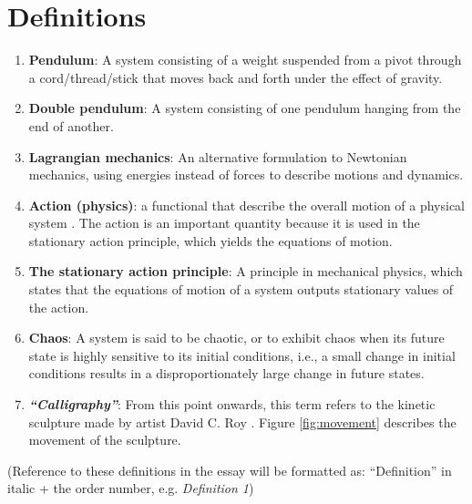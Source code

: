 \documentclass[a4paper,12pt]{article}
\begin{document}
\section{Definitions}
    \begin{enumerate}
        \item \textbf{Pendulum}: A system consisting of a weight suspended from a pivot through a cord/thread/stick that moves back and forth under the effect of gravity. \cite{pendulum}
        \item \textbf{Double pendulum}: A system consisting of one pendulum hanging from the end of another. \cite{double-pendulum}
        \item \textbf{Lagrangian mechanics}: An alternative formulation to Newtonian mechanics, using energies instead of forces to describe motions and dynamics. \cite{lib-lagrangian}
        \item \textbf{Action (physics)}: a functional that describe the overall motion of a physical system \cite{action}. The action is an important quantity because it is used in the stationary action principle, which yields the equations of motion.
        \item \textbf{The stationary action principle}: A principle in mechanical physics, which states that the equations of motion of a system outputs stationary values of the action. \cite{mann-2018}
        \item \textbf{Chaos}: A system is said to be chaotic, or to exhibit chaos when its future state is highly sensitive to its initial conditions, i.e., a small change in initial conditions results in a disproportionately large change in future states. \cite{helsinki}
        \item \textbf{\textit{“Calligraphy”}}: From this point onwards, this term refers to the kinetic sculpture made by artist David C. Roy \cite{roy-2021}. Figure \ref{fig:movement} describes the movement of the sculpture.
    \end{enumerate}
    (Reference to these definitions in the essay will be formatted as: “Definition” in italic + the order number, e.g. \textit{Definition 1})
\end{document}

